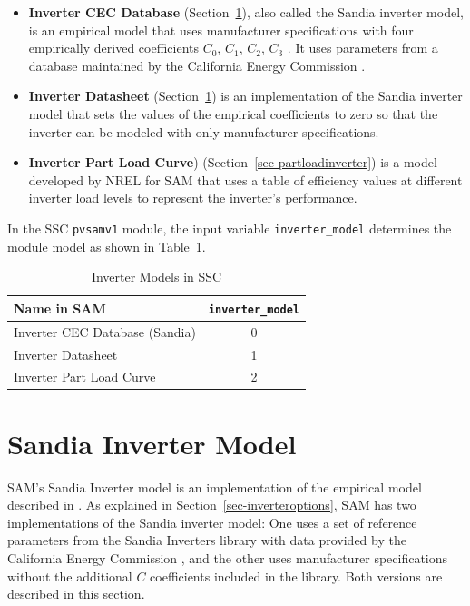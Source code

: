 \documentclass[12pt,letterpaper]{article}
\begin{document}
\begin{itemize}
\item \textbf{Inverter CEC Database} (Section~\ref{sec-sandiainverter}), also called the Sandia inverter model, is an empirical model that uses manufacturer specifications with four empirically derived coefficients $C_0$, $C_1$, $C_2$, $C_3$ \citep{king2007}. It uses parameters from a database maintained by the California Energy Commission \citep{gsc2014a}.
\item \textbf{Inverter Datasheet} (Section~\ref{sec-sandiainverter}) is an implementation of the Sandia inverter model that sets the values of the empirical coefficients to zero so that the inverter can be modeled with only manufacturer specifications.
\item \textbf{Inverter Part Load Curve}) (Section~\ref{sec-partloadinverter}) is a model developed by NREL for SAM that uses a table of efficiency values at different inverter load levels to represent the inverter's performance.
\end{itemize}

In the SSC \texttt{pvsamv1} module, the input variable \texttt{inverter\_model} determines the module model as shown in Table~\ref{tab-invertersubmodels}.

\begin{table}
\begin{center}
\caption{Inverter Models in SSC}
\begin{tabular}{lc}
\midrule
Name in SAM & \texttt{inverter\_model} \\
\midrule
Inverter CEC Database (Sandia) & 0 \\
Inverter Datasheet & 1 \\
Inverter Part Load Curve & 2 \\
\hline
\end{tabular}
\label{tab-invertersubmodels}
\end{center}
\end{table}

\section{Sandia Inverter Model}\label{sec-sandiainverter}

SAM's Sandia Inverter model is an implementation of the empirical model described in \citet{king2007}. As explained in Section~\ref{sec-inverteroptions}, SAM has two implementations of the Sandia inverter model: One uses  a set of reference parameters from the Sandia Inverters library with data provided by the California Energy Commission \citep{gsc2014a}, and the other uses manufacturer specifications without the additional $C$ coefficients included in the library. Both versions are described in this section.
\end{document}
